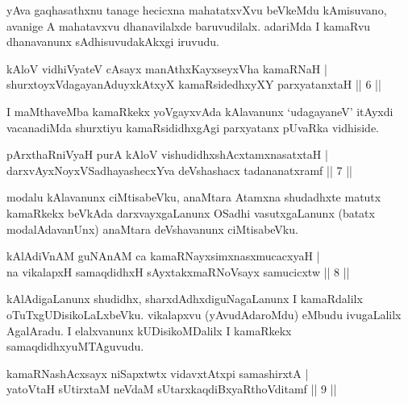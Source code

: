 \begin{artha}
yAva gaqhasathxnu tanage hecicxna mahatatxvXvu beVkeMdu kAmisuvano, avanige A mahatavxvu dhanavilalxde baruvudilalx. adariMda I kamaRvu dhanavanunx sAdhisuvudakAkxgi iruvudu.
\end{artha}


\begin{shl}
kAloV vidhiVyateV cAsayx manAthxKayxseyxVha kamaRNaH | \\
shurxtoyxVdagayanAduyxkAtxyX kamaRsidedhxyXY parxyatanxtaH \hfill|| 6 || 
\end{shl}

\begin{artha}
I maMthaveMba kamaRkekx yoVgayxvAda kAlavanunx `udagayaneV' itAyxdi vacanadiMda shurxtiyu kamaRsididhxgAgi parxyatanx pUvaRka vidhiside.
\end{artha}


\begin{shl}
pArxthaRniVyaH purA kAloV vishudidhxshAcx\s \s tamxnasatxtaH | \\
darxvAyxNoyxVSadhayashecxYva deVshashacx tadananatxramf \hfill|| 7 || 
\end{shl}

\begin{artha}
modalu kAlavanunx ciMtisabeVku, anaMtara Atamxna shudadhxte matutx kamaRkekx beVkAda darxvayxgaLanunx OSadhi vasutxgaLanunx (batatx modalAdavanUnx) anaMtara deVshavanunx ciMtisabeVku.
\end{artha}

\begin{shl}
kAlAdiVnAM guNAnAM ca kamaRNayxsimxnasxmucacxyaH | \\
na vikalapxH samaqdidhxH sAyxtakxmaRNoV\s sayx samucicxtw \hfill|| 8 || 
\end{shl}

\begin{artha}
kAlAdigaLanunx shudidhx, sharxdAdhxdiguNagaLanunx I kamaRdalilx oTuTxgUDisikoLaLxbeVku. vikalapxvu (yAvudAdaroMdu) eMbudu ivugaLalilx AgalAradu. I elalxvanunx kUDisikoMDalilx I kamaRkekx samaqdidhxyuMTAguvudu.
\end{artha}


\begin{shl}
kamaRNashAcxsayx niSapxtwtx vidavxtAtx\s pi samashirxtA | \\
yatoV\s taH sUtirxtaM neVdaM sUtarxkaqdiBxyaRthoVditamf \hfill|| 9 || 
\end{shl}

